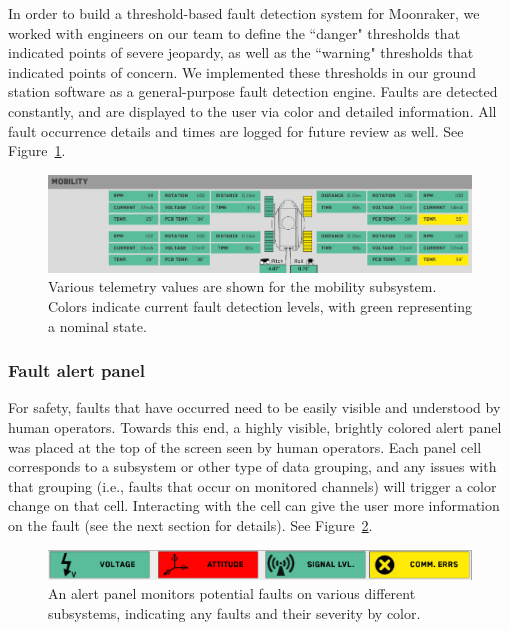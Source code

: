 In order to build a threshold-based fault detection system for Moonraker, we worked with engineers on our team to define the ``danger" thresholds that indicated points of severe jeopardy, as well as the ``warning" thresholds that indicated points of concern. We implemented these thresholds in our ground station software as a general-purpose fault detection engine. Faults are detected constantly, and are displayed to the user via color and detailed information. All fault occurrence details and times are logged for future review as well. See Figure~\ref{fig:mobility_telem_subpanel}.

\begin{figure}[h]
\centering
    \includegraphics[width=\columnwidth]{images/mobility_telem_subpanel.png}
    \caption{Various telemetry values are shown for the mobility subsystem. Colors indicate current fault detection levels, with green representing a nominal state.}
    \label{fig:mobility_telem_subpanel}
\end{figure}

\subsubsection{Fault alert panel}

For safety, faults that have occurred need to be easily visible and understood by human operators. Towards this end, a highly visible, brightly colored alert panel was placed at the top of the screen seen by human operators. Each panel cell corresponds to a subsystem or other type of data grouping, and any issues with that grouping (i.e., faults that occur on monitored channels) will trigger a color change on that cell. Interacting with the cell can give the user more information on the fault (see the next section for details). See Figure~\ref{fig:alert_panel}.

\begin{figure}[h]
\centering
    \includegraphics[width=\columnwidth]{images/alert_panel.png}
    \caption{An alert panel monitors potential faults on various different subsystems, indicating any faults and their severity by color.}
    \label{fig:alert_panel}
\end{figure}

